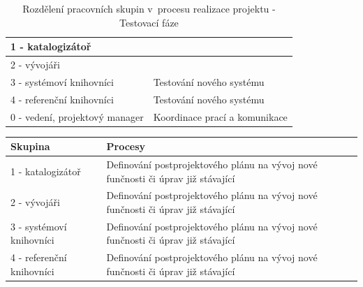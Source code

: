 \documentclass[
	11pt, oneside, printed, final, palatino, monochrome
	microtype,
	table,   %
	lof,     %
	lot     %
]{fithesis3}
\newcommand{\bold}[1]{\textbf{#1}}
\begin{document}
{\begin{table}[H]
\begin{tabular}{| p{3cm} | p{8.3cm} |}
	1 - katalogizátoř
    & 

    \\ \hline
    
	2 - vývojáři
    & 

    \\ \hline
    
	3 - systémoví knihovníci
    & 
    Testování nového systému
    \\ \hline
    
	4 - referenční knihovníci
    & 
    Testování nového systému
    \\ \hline
    
	0 - vedení, projektový manager
    & 
    Koordinace prací a komunikace
    \\ \hline
    
    \end{tabular}
    \caption{Rozdělení pracovních skupin v~procesu realizace projektu - Testovací fáze}
\end{table}

\begin{table}[H]
    \centering
    \begin{tabular}{| p{3cm} | p{8.3cm} |}
    \hline
    \bold{Skupina} 	
    & 
    \bold{Procesy} 
    \\ \hline
    
	1 - katalogizátoř
    & 
	Definování postprojektového plánu na vývoj nové funčnosti či úprav již stávající
    \\ \hline
    
	2 - vývojáři
    & 
	Definování postprojektového plánu na vývoj nové funčnosti či úprav již stávající
    \\ \hline
    
	3 - systémoví knihovníci
    & 
    Definování postprojektového plánu na vývoj nové funčnosti či úprav již stávající
    \\ \hline
    
	4 - referenční knihovníci
    & 
    Definování postprojektového plánu na vývoj nové funčnosti či úprav již stávající
    \\ \hline
    

\end{tabular}
\end{table}}
\end{document}
